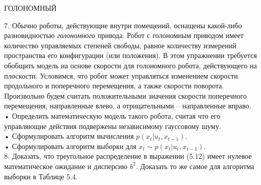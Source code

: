 \documentclass[10pt,a4paper]{article}
\begin{document}
ГОЛОНОМНЫЙ 

7. Обычно роботы, действующие внутри помещений, оснащены какой-либо разновидностью \textit{голономного} привода. Робот с голономным приводом имеет количество управляемых степеней свободы, равное количеству измерений пространства его конфигурации (или положения). В этом упражнении требуется обобщить модель на основе скорости для голономного робота, действующего на плоскости. Условимся, что робот может управляться изменением скорости продольного и поперечного перемещения, а также скорости поворота. Произвольно будем считать положительными значения скорости поперечного перемещения, направленные влево, а отрицательными – направленные вправо. \\

• Определить математическую модель такого робота, считая что его управляющие действия подвержены независимому гауссовому шуму.\\

• Сформулировать алгоритм вычисления $p(x_t | u_t, x_{t-1})$.\\

• Сформулировать алгоритм выборки для $x_t\sim p(x_t | u_t, x_{t-1})$.\\

8. Доказать, что треугольное распределение в выражении (5.12) имеет нулевое математическое ожидание и дисперсию $b^2$. Доказать то же самое для алгоритма выборки в Таблице 5.4.\\
\end{document}
